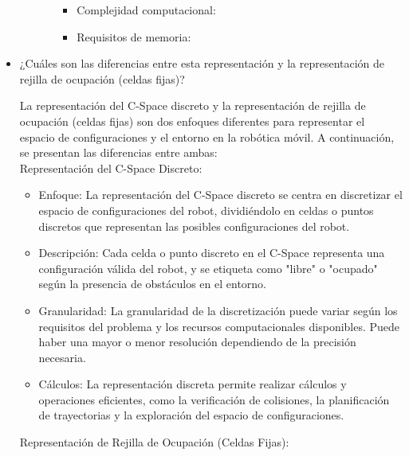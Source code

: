 \documentclass{article}
\begin{document}
\begin{itemize}
\begin{itemize}
\begin{itemize}
      \begin{itemize}
      \item Complejidad computacional:
      \item Requisitos de memoria:
      \end{itemize}
    \end{itemize}
  \end{itemize}
  
\item {¿Cuáles son las diferencias entre esta representación y la representación de rejilla de ocupación (celdas fijas)?}

  La representación del C-Space discreto y la representación de rejilla de ocupación (celdas fijas) son dos enfoques diferentes para representar el espacio de configuraciones y el entorno en la robótica móvil. A continuación, se presentan las diferencias entre ambas:\\
  
Representación del C-Space Discreto:

\begin{itemize}
\item Enfoque: La representación del C-Space discreto se centra en discretizar el espacio de configuraciones del robot, dividiéndolo en celdas o puntos discretos que representan las posibles configuraciones del robot.
\item Descripción: Cada celda o punto discreto en el C-Space representa una configuración válida del robot, y se etiqueta como "libre" o "ocupado" según la presencia de obstáculos en el entorno.
\item Granularidad: La granularidad de la discretización puede variar según los requisitos del problema y los recursos computacionales disponibles. Puede haber una mayor o menor resolución dependiendo de la precisión necesaria.
\item Cálculos: La representación discreta permite realizar cálculos y operaciones eficientes, como la verificación de colisiones, la planificación de trayectorias y la exploración del espacio de configuraciones.
\end{itemize}

Representación de Rejilla de Ocupación (Celdas Fijas):


\end{itemize}
\end{document}
